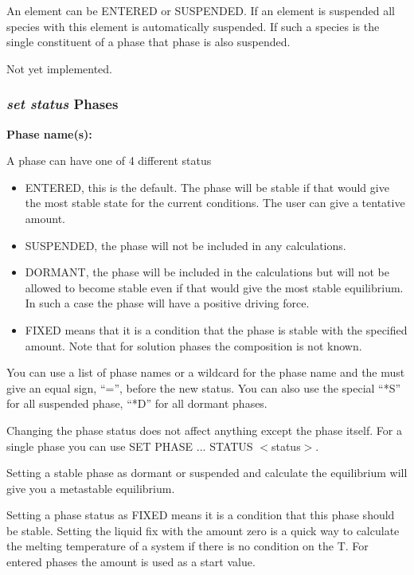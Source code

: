 \documentclass[11pt]{article}
\begin{document}
An element can be ENTERED or SUSPENDED.  If an element is suspended
all species with this element is automatically suspended.  If such a
species is the single constituent of a phase that phase is also
suspended.

Not yet implemented.

\subsubsection{{\em set status} Phases}\label{sc:set-status-phase}
\hypertarget{Set status phase}{}

\hypertarget{Status phase}{{\bf Phase name(s):}}

A phase can have one of 4 different status

\begin{itemize}
\item ENTERED, this is the default.  The phase will be stable if that
  would give the most stable state for the current conditions.  The user
  can give a tentative amount.
\item SUSPENDED, the phase will not be included in any calculations.
\item DORMANT, the phase will be included in the calculations but will
  not be allowed to become stable even if that would give the most
  stable equilibrium.  In such a case the phase will have a positive
  driving force.
\item FIXED means that it is a condition that the phase is stable with
  the specified amount.  Note that for solution phases the composition
  is not known.
\end{itemize}

You can use a list of phase names or a wildcard for the phase name and
the must give an equal sign, ``='', before the new status.  You can
also use the special ``*S'' for all suspended phase, ``*D'' for all
dormant phases.

Changing the phase status does not affect anything except the phase
itself.  For a single phase you can use SET PHASE ... STATUS $<$status$>$.

\hypertarget{Set status phase amount}{}

Setting a stable phase as dormant or suspended and calculate the
equilibrium will give you a metastable equilibrium.

Setting a phase status as FIXED means it is a condition that this
phase should be stable.  Setting the liquid fix with the amount zero
is a quick way to calculate the melting temperature of a system if
there is no condition on the T.  For entered phases the amount is used
as a start value.
\end{document}
